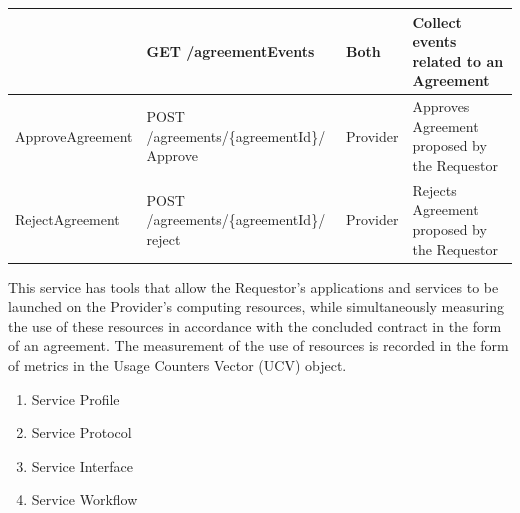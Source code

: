 \begin{enumerate}
\begin{enumerate}
\begin{table}[H]
\begin{center}
\begin{tabular}{|p{3cm}|p{7cm}|p{1.5cm}|p{4cm}|}
					& GET /agreementEvents											& Both 		& 	Collect events related to an Agreement \\
\hline

ApproveAgreement	& POST /agreements/\{agreementId\}/ \newline Approve			& Provider	&	Approves Agreement proposed by the Requestor \\
\hline

RejectAgreement		& POST /agreements/\{agreementId\}/ \newline reject				& Provider	&	Rejects Agreement proposed by the Requestor	\\
\hline

\end{tabular}
\end{center}
\end{table}

\end{enumerate}

\end{enumerate}



This service has tools that allow the Requestor's applications and services to be launched on the Provider's computing resources,
while simultaneously measuring the use of these resources in accordance with the concluded contract in the form of an agreement. 
The measurement of the use of resources is recorded in the form of metrics in the Usage Counters Vector (UCV) object.


\begin{enumerate}
    \item Service Profile
    \item Service Protocol
    \item Service Interface
    \item Service Workflow
\end{enumerate}


